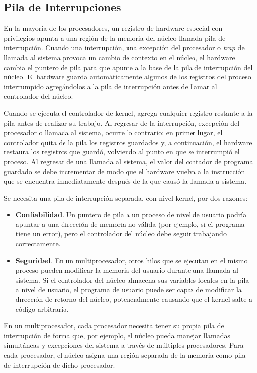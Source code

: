 \documentclass[10pt]{book}
\begin{document}
\subsection{Pila de Interrupciones}
En la mayoría de los procesadores, un registro de hardware especial con privilegios apunta a una región de la memoria del núcleo llamada pila de interrupción. Cuando una interrupción, una excepción del procesador o \textit{trap} de llamada al sistema provoca un cambio de contexto en el núcleo, el hardware cambia el puntero de pila para que apunte a la base de la pila de interrupción del núcleo. El hardware guarda automáticamente algunos de los registros del proceso interrumpido agregándolos a la pila de interrupción antes de llamar al controlador del núcleo.

Cuando se ejecuta el controlador de kernel, agrega cualquier registro restante a la pila antes de realizar su trabajo. Al regresar de la interrupción, excepción del procesador o llamada al sistema, ocurre lo contrario: en primer lugar, el controlador quita de la pila los registros guardados y, a continuación, el hardware restaura los registros que guardó, volviendo al punto en que se interrumpió el proceso. Al regresar de una llamada al sistema, el valor del contador de programa guardado se debe incrementar de modo que el hardware vuelva a la instrucción que se encuentra inmediatamente después de la que causó la llamada a sistema.

Se necesita una pila de interrupción separada, con nivel kernel, por dos razones:

\begin{itemize}
\item \textbf{Confiabilidad}. Un puntero de pila a un proceso de nivel de usuario podría apuntar a una dirección de memoria no válida (por ejemplo, si el programa tiene un error), pero el controlador del núcleo debe seguir trabajando correctamente.

\item \textbf{Seguridad}. En un multiprocesador, otros hilos que se ejecutan en el mismo proceso pueden modificar la memoria del usuario durante una llamada al sistema. Si el controlador del núcleo almacena sus variables locales en la pila a nivel de usuario, el programa de usuario puede ser capaz de modificar la dirección de retorno del núcleo, potencialmente causando que el kernel salte a código arbitrario.
\end{itemize}

En un multiprocesador, cada procesador necesita tener su propia pila de interrupción de forma que, por ejemplo, el núcleo pueda manejar llamadas simultáneas y excepciones del sistema a través de múltiples procesadores. Para cada procesador, el núcleo asigna una región separada de la memoria como pila de interrupción de dicho procesador.
\end{document}
